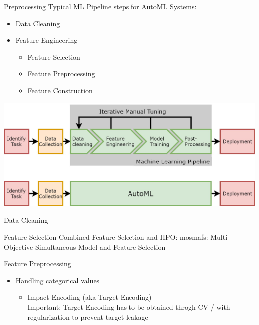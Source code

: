 \begin{frame}{Preprocessing}
    Typical ML Pipeline steps for AutoML Systems:
    \begin{itemize}
      \item Data Cleaning
      \item Feature Engineering
      \begin{itemize}
        \item Feature Selection
        \item Feature Preprocessing
        \item Feature Construction  
      \end{itemize}
    \end{itemize}
    \begin{center}
      \includegraphics[width = 0.5\linewidth]{images/AutoMLPipeline.jpg}  
    \end{center}
\end{frame}

\begin{frame}{Data Cleaning}
    
\end{frame}

\begin{frame}{Feature Selection}
  Combined Feature Selection and HPO: mosmafs: Multi-Objective Simultaneous Model and Feature Selection
    
\end{frame}

\begin{frame}{Feature Preprocessing}
  \begin{itemize}
    \item Handling categorical values
    \begin{itemize}
      \item Impact Encoding (aka Target Encoding) \\
            Important: Target Encoding has to be obtained throgh CV / with regularization to prevent target leakage
    \end{itemize}
  \end{itemize}
\end{frame}

